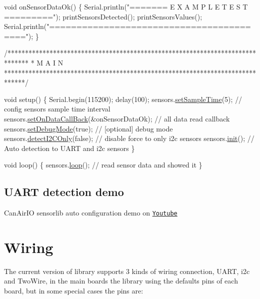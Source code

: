 \begin{DoxyCode}
\textcolor{keywordtype}{void} onSensorDataOk() \{
    Serial.println(\textcolor{stringliteral}{"======= E X A M P L E   T E S T ========="});
    printSensorsDetected();
    printSensorsValues(); 
    Serial.println(\textcolor{stringliteral}{"========================================="});
\}

\textcolor{comment}{/******************************************************************************}
\textcolor{comment}{*  M A I N}
\textcolor{comment}{******************************************************************************/}

\textcolor{keywordtype}{void} setup() \{
    Serial.begin(115200);
    delay(100);
    sensors.\hyperlink{classSensors_ac723c0d9cf5af5daa0fa8d041f41f3d8}{setSampleTime}(5);                       \textcolor{comment}{// config sensors sample time interval}
    sensors.\hyperlink{classSensors_a729f911e0508cc8814a2276ff519b219}{setOnDataCallBack}(&onSensorDataOk);     \textcolor{comment}{// all data read callback}
    sensors.\hyperlink{classSensors_ac749e2c2618a177afa7d72ce68573fa5}{setDebugMode}(\textcolor{keyword}{true});                     \textcolor{comment}{// [optional] debug mode}
    sensors.\hyperlink{classSensors_ae25465fbd64d3b2b9ae31e2cb5a4b246}{detectI2COnly}(\textcolor{keyword}{false});                   \textcolor{comment}{// disable force to only i2c sensors}
    sensors.\hyperlink{classSensors_a019efdf3e65081e9ace94e1f05338e4b}{init}();                                 \textcolor{comment}{// Auto detection to UART and i2c sensors}
\}

\textcolor{keywordtype}{void} loop() \{
    sensors.\hyperlink{classSensors_a255ece4e475221edb8ba7a8983014a76}{loop}();  \textcolor{comment}{// read sensor data and showed it}
\}
\end{DoxyCode}


\subsection*{U\+A\+RT detection demo}

\href{https://www.youtube.com/watch?v=hmukAmG5Eec}{\tt }

Can\+Air\+IO sensorlib auto configuration demo on \href{https://www.youtube.com/watch?v=hmukAmG5Eec}{\tt Youtube}

\section*{Wiring}

The current version of library supports 3 kinds of wiring connection, U\+A\+RT, i2c and Two\+Wire, in the main boards the library using the defaults pins of each board, but in some special cases the pins are\+:

